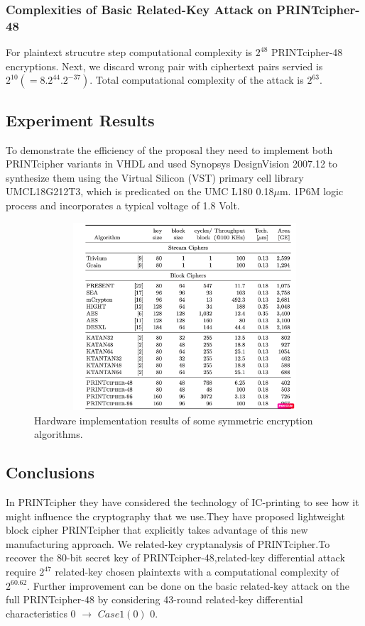 \documentclass[journal=tosc,preprint]{iacrtrans}
\begin{document}
\subsubsection{Complexities of Basic Related-Key Attack on PRINTcipher-48}
For plaintext strucutre step computational complexity is  \(2^48\) PRINTcipher-48 encryptions. Next, we discard wrong pair with ciphertext pairs servied is \(2^10(=8.2^{44}.2^{-37})\). Total computational complexity of the attack is \(2^{63}\).

\subsection{Experiment Results}
To demonstrate the efficiency of the proposal they need to implement both
PRINTcipher variants in VHDL and used Synopsys DesignVision 2007.12 to
synthesize them using the Virtual Silicon (VST) primary cell library
UMCL18G212T3, which is predicated on the UMC L180 0.18$\mu$m. 1P6M logic
process and incorporates a typical voltage of 1.8 Volt.
\begin{figure}[ht]
	\centering
	\includegraphics[height=7cm, width=12cm]{pics/hardware.png}
	\caption{Hardware implementation results of some symmetric encryption algorithms.}
\end{figure}

\subsection{Conclusions}
In PRINTcipher they have considered the technology of IC-printing to see how it might influence the  cryptography that we use.They have proposed lightweight block cipher PRINTcipher that explicitly takes advantage of this new manufacturing approach. We related-key cryptanalysis of PRINTcipher.To recover the 80-bit secret key of PRINTcipher-48,related-key differential attack require \(2^47\) related-key chosen plaintexts with a computational complexity of \(2^{60.62}\). Further improvement can be done on the basic related-key attack on the full PRINTcipher-48 by considering 43-round related-key differential characteristics 0 $\rightarrow$ \(Case 1 (0)\) 0.
\end{document}
